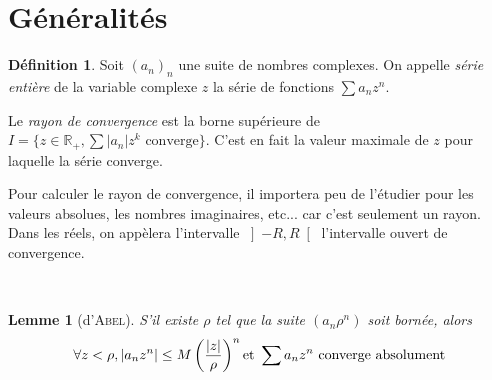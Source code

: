 \documentclass[11pt,a4paper]{report}
\newtheorem{lemme}[theorem]{Lemme}
\theoremstyle{definition}
\newtheorem{dfn}[theorem]{Définition}
\begin{document}
\section{Généralités}
\begin{dfn}
Soit $(a_n)_n$ une suite de nombres complexes. On appelle \emph{série entière} de la variable complexe $z$ la série de fonctions $\sum a_n z^n$. \par
Le \emph{rayon de convergence}
est la borne supérieure de $I=\{z\in\ensuremath{\mathbb{R}}_{+},\sum|a_{n}|z^{k}\text{ converge}\}$.
C'est en fait la valeur maximale de $z$ pour laquelle la série converge.\end{dfn}
\begin{minipage}{0.6\linewidth}
Pour calculer le rayon de convergence, il importera peu de l'étudier pour les valeurs absolues, les nombres imaginaires, etc... car c'est seulement un rayon. Dans les réels, on appèlera l'intervalle $\left] -R,R\right[$ l'intervalle ouvert de convergence.
\end{minipage}\hspace{0.1\linewidth}
\begin{minipage}{0.3\linewidth}
\end{minipage}\\
\begin{lemme}[d'\textsc{Abel}]
S'il existe $\rho$ tel que la suite $\left( a_n \rho^n \right)$ soit bornée, alors 
\begin{equation}
    \forall z<\rho,\left| a_n z^n \right| \le M\left( \dfrac{|z|}{\rho} \right)^n\\ \text{et }\sum a_n z^n\text{ converge absolument}
\end{equation}
\end{lemme}
\end{document}
